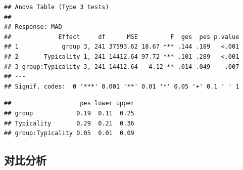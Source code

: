 \documentclass[
]{article}
\newenvironment{Shaded}{\begin{snugshade}}{\end{snugshade}}
\newcommand{\AttributeTok}[1]{\textcolor[rgb]{0.13,0.29,0.53}{#1}}
\newcommand{\CommentTok}[1]{\textcolor[rgb]{0.56,0.35,0.01}{\textit{#1}}}
\newcommand{\DecValTok}[1]{\textcolor[rgb]{0.00,0.00,0.81}{#1}}
\newcommand{\FunctionTok}[1]{\textcolor[rgb]{0.13,0.29,0.53}{\textbf{#1}}}
\newcommand{\NormalTok}[1]{#1}
\newcommand{\SpecialCharTok}[1]{\textcolor[rgb]{0.81,0.36,0.00}{\textbf{#1}}}
\begin{document}
\begin{verbatim}
## Anova Table (Type 3 tests)
## 
## Response: MAD
##             Effect     df      MSE         F  ges  pes p.value
## 1            group 3, 241 37593.62 18.67 *** .144 .189   <.001
## 2       Typicality 1, 241 14412.64 97.72 *** .101 .289   <.001
## 3 group:Typicality 3, 241 14412.64   4.12 ** .014 .049    .007
## ---
## Signif. codes:  0 '***' 0.001 '**' 0.01 '*' 0.05 '+' 0.1 ' ' 1
\end{verbatim}

\begin{Shaded}
\end{Shaded}

\begin{verbatim}
##                   pes lower upper
## group            0.19  0.11  0.25
## Typicality       0.29  0.21  0.36
## group:Typicality 0.05  0.01  0.09
\end{verbatim}

\subsection{对比分析}\label{ux5bf9ux6bd4ux5206ux6790}
\end{document}
